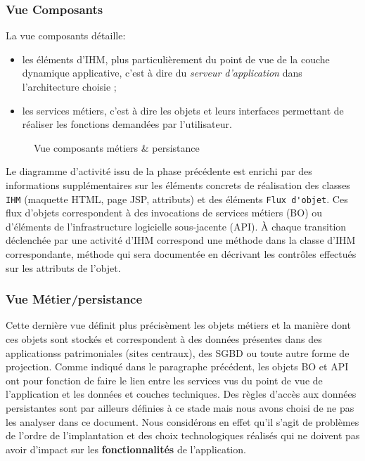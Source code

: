 \subsubsection{Vue Composants}

La vue \og composants\fg{} d\'etaille:
\begin{itemize}
\item les \'el\'ements d'\textsf{IHM}, plus
particuli\`erement du point de vue de la couche dynamique
applicative, c'est \`a dire du \emph{serveur d'application} dans
l'architecture choisie ;
\item les services m\'etiers, c'est \`a dire les objets et leurs
interfaces permettant de r\'ealiser les fonctions demand\'ees par
l'utilisateur.
\end{itemize}

\begin{figure}[htbp]
    \hfill{}
\centering   
    \caption{Vue composants m\'etiers \& persistance}
    \label{fig-vue-composant}
\end{figure}

Le diagramme d'activit\'e issu de la phase pr\'ec\'edente est
enrichi par des informations suppl\'ementaires sur les \'el\'ements
concrets de r\'ealisation des classes \verb|IHM|  (maquette HTML, page
JSP, attributs) et des \'el\'ements \verb|Flux d'objet|. Ces flux
d'objets correspondent \`a des invocations de services m\'etiers
(BO) ou d'\'el\'ements de l'infrastructure logicielle sous-jacente
(API). \`A chaque transition d\'eclench\'ee par une activit\'e
d'IHM correspond une m\'ethode dans la classe d'IHM correspondante,
m\'ethode qui sera document\'ee en d\'ecrivant les contr\^oles
effectu\'es sur les attributs de l'objet.

\subsubsection{Vue M\'etier/persistance}

Cette derni\`ere vue d\'efinit plus pr\'ecis\`ement les objets
m\'etiers et la mani\`ere dont ces objets sont stock\'es et
correspondent \`a des donn\'ees pr\'esentes dans des applicationss
patrimoniales (sites centraux), des SGBD ou toute autre forme de
projection. Comme indiqu\'e dans le paragraphe pr\'ec\'edent,
les objets BO et API ont pour fonction de faire le lien entre les
services vus du point de vue de l'application et les donn\'ees et
couches techniques.  Des r\`egles d'acc\`es aux
donn\'ees persistantes sont par ailleurs d\'efinies \`a ce stade mais nous avons
choisi de ne pas les analyser dans ce document. Nous  consid\'erons
en effet  qu'il s'agit de probl\`emes de l'ordre de l'implantation et des choix
technologiques r\'ealis\'es qui ne doivent pas avoir d'impact sur
les \textbf{fonctionnalit\'es}  de l'application.

